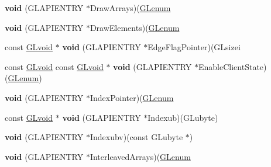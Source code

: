 \begin{DoxyCompactItemize}
\item 
\mbox{\label{struct_____g_ldispatch_table_rec_adb42e7f7901470f51bf7811d17d62469}} 
{\bfseries void} (G\+L\+A\+P\+I\+E\+N\+T\+RY $\ast$Draw\+Arrays)(\hyperlink{interfacevoid}{G\+Lenum}
\item 
\mbox{\label{struct_____g_ldispatch_table_rec_a8bc90e562ecec2cbec572ca067fad96c}} 
{\bfseries void} (G\+L\+A\+P\+I\+E\+N\+T\+RY $\ast$Draw\+Elements)(\hyperlink{interfacevoid}{G\+Lenum}
\item 
\mbox{\label{struct_____g_ldispatch_table_rec_ab4b26d2fba04edd566d468dcf0201779}} 
const \hyperlink{interfacevoid}{G\+Lvoid} $\ast$ {\bfseries void} (G\+L\+A\+P\+I\+E\+N\+T\+RY $\ast$Edge\+Flag\+Pointer)(G\+Lsizei
\item 
\mbox{\label{struct_____g_ldispatch_table_rec_a547deeb535e1c354bbe2e2dc6a42e85d}} 
const \hyperlink{interfacevoid}{G\+Lvoid} const \hyperlink{interfacevoid}{G\+Lvoid} $\ast$ {\bfseries void} (G\+L\+A\+P\+I\+E\+N\+T\+RY $\ast$Enable\+Client\+State)(\hyperlink{interfacevoid}{G\+Lenum})
\item 
\mbox{\label{struct_____g_ldispatch_table_rec_a09e544eafbc0acd56534ec361246d1ed}} 
{\bfseries void} (G\+L\+A\+P\+I\+E\+N\+T\+RY $\ast$Index\+Pointer)(\hyperlink{interfacevoid}{G\+Lenum}
\item 
\mbox{\label{struct_____g_ldispatch_table_rec_af53b45bcf2cb2f8793992891896b536f}} 
const \hyperlink{interfacevoid}{G\+Lvoid} $\ast$ {\bfseries void} (G\+L\+A\+P\+I\+E\+N\+T\+RY $\ast$Indexub)(G\+Lubyte)
\item 
\mbox{\label{struct_____g_ldispatch_table_rec_adafbc4ade24c2c27762f01ac0c06bc17}} 
{\bfseries void} (G\+L\+A\+P\+I\+E\+N\+T\+RY $\ast$Indexubv)(const G\+Lubyte $\ast$)
\item 
\mbox{\label{struct_____g_ldispatch_table_rec_a6e46ec252303738a4ef4ea46c92f2337}} 
{\bfseries void} (G\+L\+A\+P\+I\+E\+N\+T\+RY $\ast$Interleaved\+Arrays)(\hyperlink{interfacevoid}{G\+Lenum}

\end{DoxyCompactItemize}
